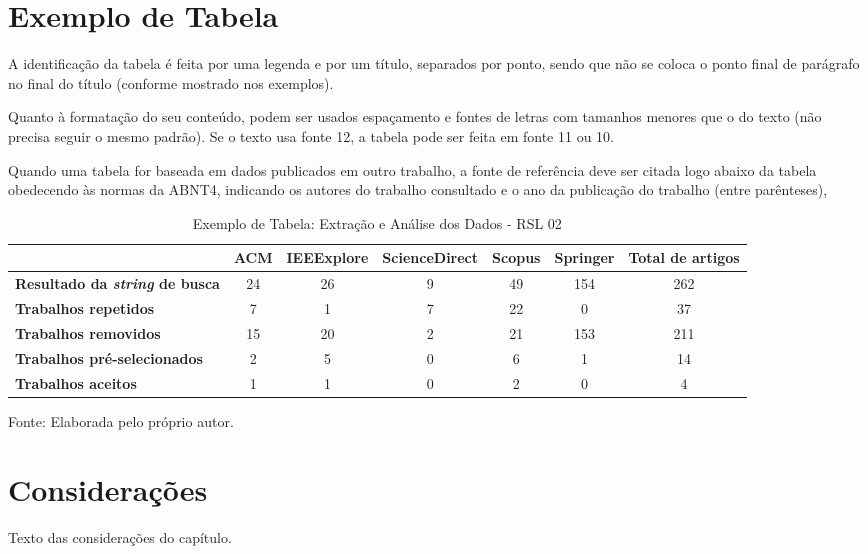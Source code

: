 \section{Exemplo de Tabela}
\label{ss_c2_exemplo-tabela}


A identificação da tabela é feita por uma legenda e por um título, separados por ponto, sendo que não se coloca o ponto final de parágrafo no final do título (conforme mostrado nos exemplos).

Quanto à formatação do seu conteúdo, podem ser usados espaçamento e fontes de letras com tamanhos menores que o do texto (não precisa seguir o mesmo padrão). Se o texto usa fonte 12, a tabela pode ser feita em fonte 11 ou 10.

Quando uma tabela for baseada em dados publicados em outro trabalho, a fonte de referência deve ser citada logo abaixo da tabela obedecendo às normas da ABNT4, indicando os autores do trabalho consultado e o ano da publicação do trabalho (entre parênteses),

\begin{table}[!htbp]
\begin{center}
\begin{footnotesize}
\caption{Exemplo de Tabela: Extração e Análise dos Dados - RSL 02}
\label{t_apendiceC-rsl}

\begin{tabular}{l|c|c|c|c|c|c|}
\cline{2-7}
 & \textbf{ACM} & \textbf{IEEExplore} & \multicolumn{1}{l|}{\textbf{ScienceDirect}} & \textbf{Scopus} & \textbf{Springer} & \textbf{Total de artigos} \\ \hline
\multicolumn{1}{|l|}{\textbf{Resultado da \textit{string} de busca}} & 24 & 26 & 9 & 49 & 154 & 262 \\ \hline
\multicolumn{1}{|l|}{\textbf{Trabalhos repetidos}} & 7 & 1 & 7 & 22 & 0 & 37 \\ \hline
\multicolumn{1}{|l|}{\textbf{Trabalhos removidos}} & 15 & 20 & 2 & 21 & 153 & 211 \\ \hline
\multicolumn{1}{|l|}{\textbf{Trabalhos pré-selecionados}} & 2 & 5 & 0 & 6 & 1 & 14 \\ \hline
\multicolumn{1}{|l|}{\textbf{Trabalhos aceitos}} & 1 & 1 & 0 & 2 & 0 & 4 \\ \hline
\end{tabular}

\end{footnotesize}
\end{center}
\raggedright Fonte: Elaborada pelo próprio autor.
\end{table}



\section{Considerações}
\label{s_c2_consideracoes}

Texto das considerações do capítulo.
